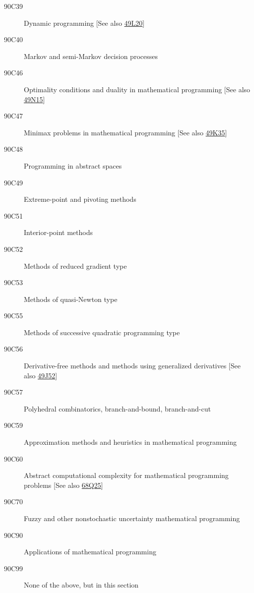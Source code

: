 \begin{description}
\item [90C39]\label{90C39} Dynamic programming [See also \hyperref[49L20]{49L20}]
\item [90C40]\label{90C40} Markov and semi-Markov decision processes
\item [90C46]\label{90C46} Optimality conditions and duality in mathematical programming [See also \hyperref[49N15]{49N15}]
\item [90C47]\label{90C47} Minimax problems in mathematical programming [See also \hyperref[49K35]{49K35}]
\item [90C48]\label{90C48} Programming in abstract spaces
\item [90C49]\label{90C49} Extreme-point and pivoting methods
\item [90C51]\label{90C51} Interior-point methods
\item [90C52]\label{90C52} Methods of reduced gradient type
\item [90C53]\label{90C53} Methods of quasi-Newton type
\item [90C55]\label{90C55} Methods of successive quadratic programming type
\item [90C56]\label{90C56} Derivative-free methods and methods using generalized derivatives [See also \hyperref[49J52]{49J52}]
\item [90C57]\label{90C57} Polyhedral combinatorics, branch-and-bound, branch-and-cut
\item [90C59]\label{90C59} Approximation methods and heuristics in mathematical programming
\item [90C60]\label{90C60} Abstract computational complexity for mathematical programming problems [See also \hyperref[68Q25]{68Q25}]
\item [90C70]\label{90C70} Fuzzy and other nonstochastic uncertainty mathematical programming 
\item [90C90]\label{90C90} Applications of mathematical programming
\item [90C99]\label{90C99} None of the above, but in this section
\end{description}
